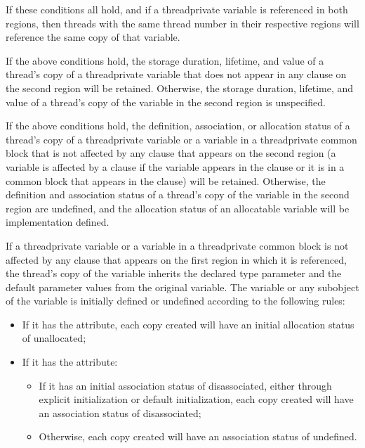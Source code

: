 If these conditions all hold, and if a threadprivate variable is referenced in 
both regions, then threads with the same thread number in their respective 
regions will reference the same copy of that variable.

\begin{ccppspecific}
If the above conditions hold, the storage duration, lifetime, and value of a 
thread's copy of a threadprivate variable that does not appear in any 
 clause on the second region will be retained. Otherwise, the 
storage duration, lifetime, and value of a thread's copy of the variable in 
the second region is unspecified.
\end{ccppspecific}

\begin{fortranspecific}
If the above conditions hold, the definition, association, or allocation 
status of a thread's copy of a threadprivate variable or a variable in a 
threadprivate common block that is not affected by any  clause 
that appears on the second region (a variable is affected by a  
clause if the variable appears in the  clause or it is in a 
common block that appears in the  clause) will be retained.
Otherwise, the definition and association status of a thread's copy of the 
variable in the second region are undefined, and the allocation status of 
an allocatable variable will be implementation defined.

If a threadprivate variable or a variable in a threadprivate common block is
not affected by any  clause that appears on the first  
region in which it is referenced, the thread's copy of the variable inherits the
declared type parameter and the default parameter values from the original variable.  
The variable or any subobject of the variable is initially defined or
undefined according to the following rules:

\begin{itemize}
\item If it has the  attribute, each copy created will have 
      an initial allocation status of unallocated;
\item If it has the  attribute:

\begin{itemize}
\item If it has an initial association status of disassociated, either through 
      explicit initialization or default initialization, each copy created will 
      have an association status of disassociated;
\item Otherwise, each copy created will have an association status of undefined.
\end{itemize}


\end{itemize}
\end{fortranspecific}

